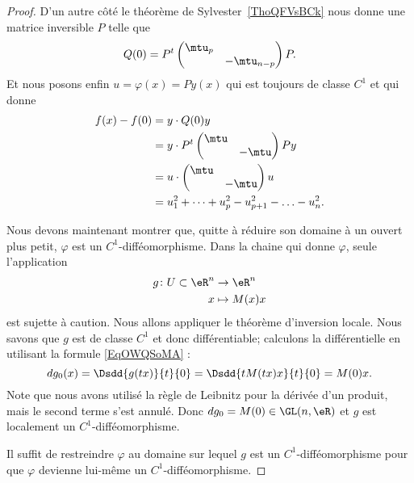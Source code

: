 \begin{proof}
	D'un autre côté le théorème de Sylvester~\ref{ThoQFVsBCk} nous donne une matrice inversible \( P\) telle que
	\begin{equation}
		Q(0)=P^t\begin{pmatrix}
			\mtu_p &             \\
			       & -\mtu_{n-p}
		\end{pmatrix}P.
	\end{equation}
	Et nous posons enfin \( u=\varphi(x)=Py(x)\) qui est toujours de classe \( C^1\) et qui donne
	\begin{subequations}
		\begin{align}
			f(x)-f(0) & = y\cdot Q(0)y                                 \\
			          & = y\cdot P^t\begin{pmatrix}
				                        \mtu &       \\
				                             & -\mtu
			                        \end{pmatrix}Py                    \\
			          & = u\cdot\begin{pmatrix}
				                    \mtu &       \\
				                         & -\mtu
			                    \end{pmatrix}u                         \\
			          & = u_1^2+\cdots +u_p^2-u_{p+1}^2-\ldots -u_n^2.
		\end{align}
	\end{subequations}

	Nous devons maintenant montrer que, quitte à réduire son domaine à un ouvert plus petit, \( \varphi\) est un \( C^1\)-difféomorphisme. Dans la chaine qui donne \( \varphi\), seule l'application
	\begin{equation}
		\begin{aligned}
			g\colon U\subset \eR^n & \to \eR^n     \\
			x                      & \mapsto M(x)x
		\end{aligned}
	\end{equation}
	est sujette à caution. Nous allons appliquer le théorème d'inversion locale. Nous savons que \( g\) est de classe \( C^1\) et donc différentiable; calculons la différentielle en utilisant la formule \eqref{EqOWQSoMA} :
	\begin{equation}
		dg_0(x)=\Dsdd{ g(tx) }{t}{0}=\Dsdd{ tM(tx)x }{t}{0}=M(0)x.
	\end{equation}
	Note que nous avons utilisé la règle de Leibnitz pour la dérivée d'un produit, mais le second terme s'est annulé. Donc \( dg_0=M(0)\in \GL(n,\eR)\) et \( g\) est localement un \( C^1\)-difféomorphisme.

	Il suffit de restreindre \( \varphi\) au domaine sur lequel \( g\) est un \( C^1\)-difféomorphisme pour que \( \varphi\) devienne lui-même un \( C^1\)-difféomorphisme.

\end{proof}

